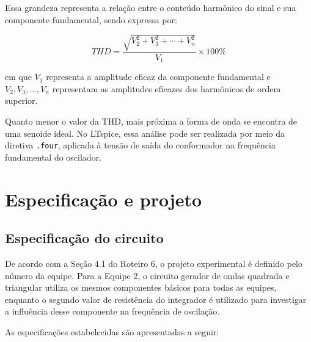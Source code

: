 \documentclass[11pt,a4paper]{article}
\begin{document}
Essa grandeza representa a relação entre o conteúdo harmônico do sinal e sua componente fundamental, sendo expressa por:

\begin{equation}
THD=
\frac{\sqrt{V_2^2+V_3^2+\cdots+V_n^2}}
{V_1}\times100\%
\end{equation}

em que $V_1$ representa a amplitude eficaz da componente fundamental e $V_2,V_3,\ldots,V_n$ representam as amplitudes eficazes dos harmônicos de ordem superior.

Quanto menor o valor da THD, mais próxima a forma de onda se encontra de uma senoide ideal. No LTspice, essa análise pode ser realizada por meio da diretiva \texttt{.four}, aplicada à tensão de saída do conformador na frequência fundamental do oscilador.

\section{Especificação e projeto}


\subsection{Especificação do circuito}

De acordo com a Seção 4.1 do Roteiro 6, o projeto experimental é definido pelo número da equipe. Para a Equipe 2, o circuito gerador de ondas quadrada e triangular utiliza os mesmos componentes básicos para todas as equipes, enquanto o segundo valor de resistência do integrador é utilizado para investigar a influência desse componente na frequência de oscilação.

As especificações estabelecidas são apresentadas a seguir:
\end{document}
